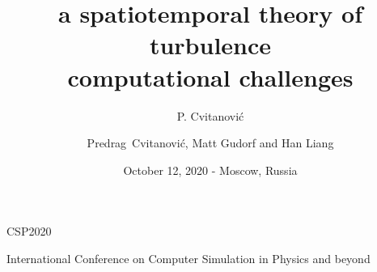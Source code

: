 


\usepackage[font=scriptsize, labelfont=bf]{caption}
\usepackage[
    backend=biber,  %
    sorting=nyt,
    style=numeric, %
    natbib=true,
    style=phys, %
    biblabel= brackets, %
    articletitle=false, %
    pageranges = true , %
    sortlocale=en_US,
    firstinits=true,
    url=false, %
    doi=false, %
    eprint=false
]{biblatex}


\renewcommand{\Ssym}[1]{{\ensuremath{m_{#1}}}}    %

\makeatletter
\let\@@magyar@captionfix\relax
\makeatother




\title{
{a spatiotemporal theory of}
{\huge turbulence}
    \\
{computational challenges}
}
\author{P. Cvitanovi\'c}
\author[Cvitanovi\'c]
{
  \textcolor{green!50!black}{
  {Predrag~Cvitanovi\'c,
  Matt Gudorf
  and
  Han Liang
  }	%
  }
}
\institute
{
{{\large CSP2020}}
\medskip

International Conference on Computer Simulation in Physics and beyond
 }
\date{October 12, 2020 - Moscow, Russia}

